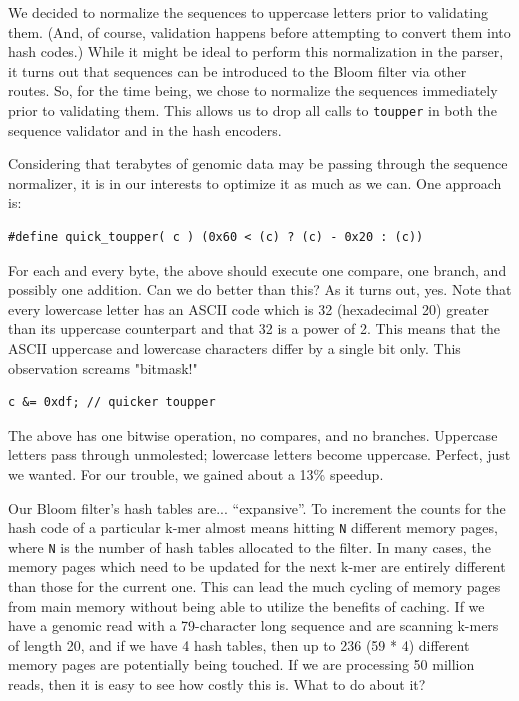 \documentclass{article}
\begin{document}
We decided to normalize the sequences to uppercase letters prior to validating them. (And, of course, validation happens before attempting to convert them into hash codes.) While it might be ideal to perform this normalization in the parser, it turns out that sequences can be introduced to the Bloom filter via other routes. So, for the time being, we chose to normalize the sequences immediately prior to validating them. This allows us to drop all calls to \texttt{toupper} in both the sequence validator and in the hash encoders.

Considering that terabytes of genomic data may be passing through the sequence normalizer, it is in our interests to optimize it as much as we can. One approach is:

\begin{verbatim}
#define quick_toupper( c ) (0x60 < (c) ? (c) - 0x20 : (c))
\end{verbatim}

For each and every byte, the above should execute one compare, one branch, and possibly one addition. Can we do better than this? As it turns out, yes. Note that every lowercase letter has an ASCII code which is 32 (hexadecimal 20) greater than its uppercase counterpart and that 32 is a power of 2. This means that the ASCII uppercase and lowercase characters differ by a single bit only. This observation screams "bitmask!"

\begin{verbatim}
c &= 0xdf; // quicker toupper
\end{verbatim}

The above has one bitwise operation, no compares, and no branches. Uppercase letters pass through unmolested; lowercase letters become uppercase. Perfect, just we wanted. For our trouble, we gained about a 13\% speedup.

Our Bloom filter's hash tables are... ``expansive''. To increment the counts for the hash code of a particular k-mer almost means hitting \texttt{N} different memory pages, where \texttt{N} is the number of hash tables allocated to the filter. In many cases, the memory pages which need to be updated for the next k-mer are entirely different than those for the current one. This can lead the much cycling of memory pages from main memory without being able to utilize the benefits of caching. If we have a genomic read with a 79-character long sequence and are scanning k-mers of length 20, and if we have 4 hash tables, then up to 236 (59 * 4) different memory pages are potentially being touched. If we are processing 50 million reads, then it is easy to see how costly this is. What to do about it?
\end{document}
